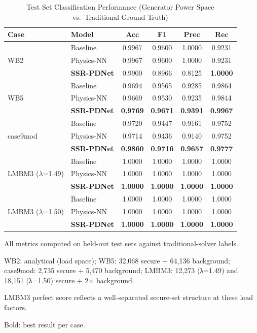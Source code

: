 \documentclass[journal]{IEEEtran}
\begin{document}
\begin{table}[!t]
  \centering
  \caption{Test Set Classification Performance (Generator Power Space vs.\ Traditional Ground Truth)}
  \label{tab:results}
  \begin{threeparttable}
  \begin{tabular}{llcccc}
    \toprule
    Case & Model & Acc & F1 & Prec & Rec \\
    \midrule
    \multirow{3}{*}{WB2}
      & Baseline   & 0.9967 & 0.9600 & 1.0000 & 0.9231 \\
      & Physics-NN & 0.9967 & 0.9600 & 1.0000 & 0.9231 \\
      & \textbf{SSR-PDNet}   & 0.9900 & 0.8966 & 0.8125 & \textbf{1.0000} \\
    \midrule
    \multirow{3}{*}{WB5}
      & Baseline   & 0.9694 & 0.9565 & 0.9285 & 0.9864 \\
      & Physics-NN & 0.9669 & 0.9530 & 0.9235 & 0.9844 \\
      & \textbf{SSR-PDNet}   & \textbf{0.9769} & \textbf{0.9671} & \textbf{0.9391} & \textbf{0.9967} \\
    \midrule
    \multirow{3}{*}{case9mod}
      & Baseline   & 0.9720 & 0.9447 & 0.9161 & 0.9752 \\
      & Physics-NN & 0.9714 & 0.9436 & 0.9140 & 0.9752 \\
      & \textbf{SSR-PDNet}   & \textbf{0.9860} & \textbf{0.9716} & \textbf{0.9657} & \textbf{0.9777} \\
    \midrule
    \multirow{3}{*}{LMBM3 ($\lambda$=1.49)}
      & Baseline   & 1.0000 & 1.0000 & 1.0000 & 1.0000 \\
      & Physics-NN & 1.0000 & 1.0000 & 1.0000 & 1.0000 \\
      & \textbf{SSR-PDNet}   & \textbf{1.0000} & \textbf{1.0000} & \textbf{1.0000} & \textbf{1.0000} \\
    \midrule
    \multirow{3}{*}{LMBM3 ($\lambda$=1.50)}
      & Baseline   & 1.0000 & 1.0000 & 1.0000 & 1.0000 \\
      & Physics-NN & 1.0000 & 1.0000 & 1.0000 & 1.0000 \\
      & \textbf{SSR-PDNet}   & \textbf{1.0000} & \textbf{1.0000} & \textbf{1.0000} & \textbf{1.0000} \\
    \bottomrule
  \end{tabular}
  \begin{tablenotes}
    \small
    \item All metrics computed on held-out test sets against traditional-solver labels.
    \item WB2: analytical (load space); WB5: 32,068 secure + 64,136 background;
          case9mod: 2,735 secure + 5,470 background;
          LMBM3: 12,273 (λ=1.49) and 18,151 (λ=1.50) secure + 2$\times$ background.
    \item LMBM3 perfect score reflects a well-separated secure-set structure at these load factors.
    \item Bold: best result per case.
  \end{tablenotes}
  \end{threeparttable}
\end{table}
\end{document}
